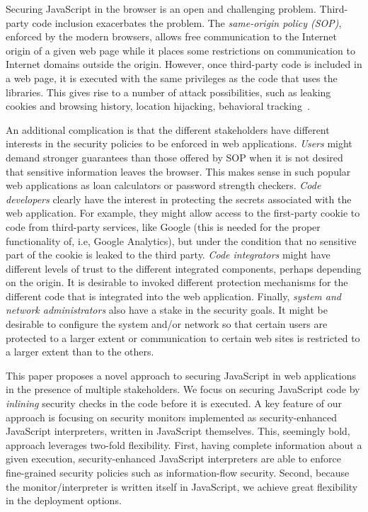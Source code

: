 \documentclass{llncs}
\begin{document}
Securing JavaScript in the browser is an open and challenging
problem. Third-party code inclusion exacerbates the
problem. The \emph{same-origin policy (SOP)}, enforced by the modern
browsers, allows free communication to the Internet origin of a given web page 
while it
places some restrictions on communication to Internet domains
outside the origin. However, once third-party code is
included in a web page, it is executed with the same privileges as the code
that uses the libraries. This gives rise to a number of attack possibilities,
such as leaking cookies and browsing history, location
hijacking, behavioral tracking~\cite{Jang+:CCS10}. 

An additional complication is that the different stakeholders have
different interests in the security policies to be enforced
in web applications. 
%
\emph{Users} might demand stronger guarantees than those
offered by SOP when it is not desired that sensitive information leaves
the browser. This makes sense in such popular web applications as loan
calculators or password strength checkers.
%
\emph{Code developers} clearly have the interest in protecting the
secrets associated with the web application. For example, they might
allow access to the first-party cookie to code from third-party
services, like Google (this is needed for the proper functionality of,
i.e, Google Analytics), but under the condition that no sensitive part
of the cookie is leaked to the third party.
%
\emph{Code integrators} might have different levels of trust to the
different integrated components, perhaps depending on the origin. It
is desirable to invoked different protection mechanisms for the
different code that is integrated into the web application.
%
Finally, \emph{system and network administrators} also have a
stake in the security goals. It might be desirable to configure the
system and/or network so that certain users are protected to a larger
extent or communication to certain web sites is restricted to a larger
extent than to the others.  

This paper proposes a novel approach to securing JavaScript in web
applications in the presence of multiple stakeholders.
%
We focus on securing JavaScript code by \emph{inlining}
security checks in the code before it is executed.
%
A key feature
of our approach is focusing on security monitors implemented as
security-enhanced JavaScript interpreters, written in JavaScript
themselves. This, seemingly bold, approach leverages two-fold
flexibility. First, having complete information about a given
execution, security-enhanced JavaScript interpreters are able to
enforce fine-grained security policies such as information-flow
security. Second, because the monitor/interpreter is written itself in
JavaScript, we achieve great flexibility in the deployment options.
 
\end{document}
